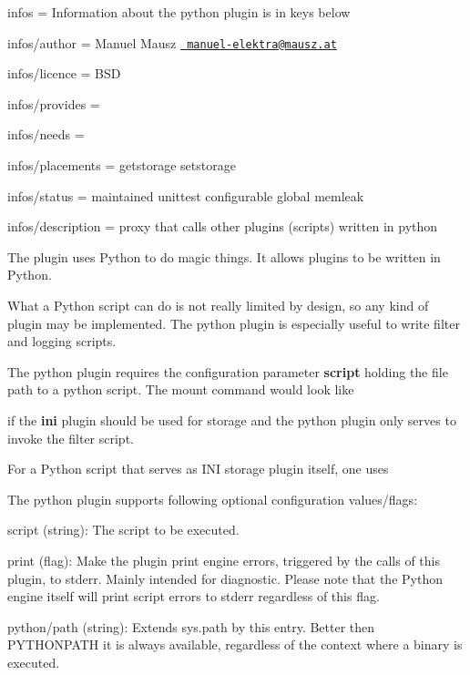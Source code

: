
\begin{DoxyItemize}
\item infos = Information about the python plugin is in keys below
\item infos/author = Manuel Mausz \href{mailto:manuel-elektra@mausz.at}{\texttt{ manuel-\/elektra@mausz.\+at}}
\item infos/licence = B\+SD
\item infos/provides =
\item infos/needs =
\item infos/placements = getstorage setstorage
\item infos/status = maintained unittest configurable global memleak
\item infos/description = proxy that calls other plugins (scripts) written in python
\end{DoxyItemize}

The plugin uses Python to do magic things. It allows plugins to be written in Python.

What a Python script can do is not really limited by design, so any kind of plugin may be implemented. The python plugin is especially useful to write filter and logging scripts.

The python plugin requires the configuration parameter {\bfseries{script}} holding the file path to a python script. The mount command would look like


\begin{DoxyCode}{0}
\end{DoxyCode}


if the {\bfseries{ini}} plugin should be used for storage and the python plugin only serves to invoke the filter script.

For a Python script that serves as I\+NI storage plugin itself, one uses


\begin{DoxyCode}{0}
\end{DoxyCode}


The python plugin supports following optional configuration values/flags\+:


\begin{DoxyItemize}
\item {\ttfamily script} (string)\+: The script to be executed.
\item {\ttfamily print} (flag)\+: Make the plugin print engine errors, triggered by the calls of this plugin, to stderr. Mainly intended for diagnostic. Please note that the Python engine itself will print script errors to stderr regardless of this flag.
\item {\ttfamily python/path} (string)\+: Extends sys.\+path by this entry. Better then P\+Y\+T\+H\+O\+N\+P\+A\+TH it is always available, regardless of the context where a binary is executed.
\end{DoxyItemize}


